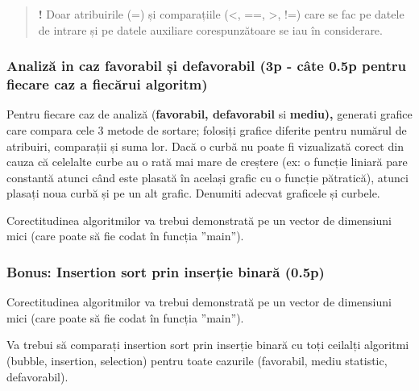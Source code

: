 \documentclass[../ro-fa-lab.tex]{subfiles}
\begin{document}
\begin{quote}
\textbf{!} Doar atribuirile (=) și comparațiile (\textless, ==,
\textgreater, !=) care se fac pe datele de intrare și pe datele
auxiliare corespunzătoare se iau în considerare.
\end{quote}

\subsubsection{Analiză in caz favorabil și defavorabil (3p - câte 0.5p
pentru fiecare caz a fiecărui
algoritm)}\label{analizux103-in-caz-favorabil-ux219i-defavorabil-3p---cuxe2te-0.5p-pentru-fiecare-caz-a-fiecux103rui-algoritm}

Pentru fiecare caz de analiză (\textbf{favorabil, defavorabil} si
\textbf{mediu),} generati grafice care compara cele 3 metode de sortare;
folosiți grafice diferite pentru numărul de atribuiri, comparații și
suma lor. Dacă o curbă nu poate fi vizualizată corect din cauza că
celelalte curbe au o rată mai mare de creștere (ex: o funcție liniară
pare constantă atunci când este plasată în același grafic cu o funcție
pătratică), atunci plasați noua curbă și pe un alt grafic. Denumiti
adecvat graficele și curbele.

Corectitudinea algoritmilor va trebui demonstrată pe un vector de
dimensiuni mici (care poate să fie codat în funcția ''main'').

\subsubsection{Bonus: Insertion sort prin inserție binară
(0.5p)}\label{bonus-insertion-sort-prin-inserux21bie-binarux103-0.5p}

Corectitudinea algoritmilor va trebui demonstrată pe un vector de
dimensiuni mici (care poate să fie codat în funcția ''main'').

Va trebui să comparați insertion sort prin inserție binară cu toți
ceilalți algoritmi (bubble, insertion, selection) pentru toate cazurile
(favorabil, mediu statistic, defavorabil).
\end{document}
